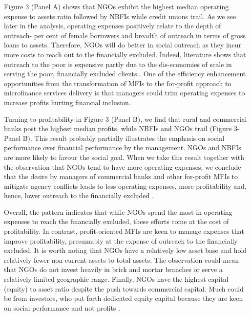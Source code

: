 \documentclass[a4paper,nobind]{templates/ociamthesis}
\begin{document}
Figure 3 (Panel A) shows that NGOs exhibit the highest median operating expense to assets ratio followed by NBFIs while credit unions trail. As we see later in the analysis, operating expenses positively relate to the depth of outreach- per cent of female borrowers and breadth of outreach in terms of gross loans to assets. Therefore, NGOs will do better in social outreach as they incur more costs to reach out to the financially excluded. Indeed, literature shows that outreach to the poor is expensive partly due to the dis-economies of scale in serving the poor, financially excluded clients \autocite{mia2017mission}. One of the efficiency enhancement opportunities from the transformation of MFIs to the for-profit approach to microfinance services delivery is that managers could trim operating expenses to increase profits hurting financial inclusion.

Turning to profitability in Figure 3 (Panel B), we find that rural and commercial banks post the highest median profits, while NBFIs and NGOs trail (Figure 3- Panel B). This result probably partially illustrates the emphasis on social performance over financial performance by the management. NGOs and NBFIs are more likely to favour the social goal. When we take this result together with the observation that NGOs tend to have more operating expenses, we conclude that the desire by managers of commercial banks and other for-profit MFIs to mitigate agency conflicts leads to less operating expenses, more profitability and, hence, lower outreach to the financially excluded \autocite{jensen1976theory}.

Overall, the pattern indicates that while NGOs spend the most in operating expenses to reach the financially excluded, these efforts come at the cost of profitability. In contrast, profit-oriented MFIs are keen to manage expenses that improve profitability, presumably at the expense of outreach to the financially excluded. It is worth noting that NGOs have a relatively low asset base and hold relatively fewer non-current assets to total assets. The observation could mean that NGOs do not invest heavily in brick and mortar branches or serve a relatively limited geographic range. Finally, NGOs have the highest capital (equity) to asset ratio despite the push towards commercial capital. Much could be from investors, who put forth dedicated equity capital because they are keen on social performance and not profits \autocite{mia2017mission}.
\end{document}
